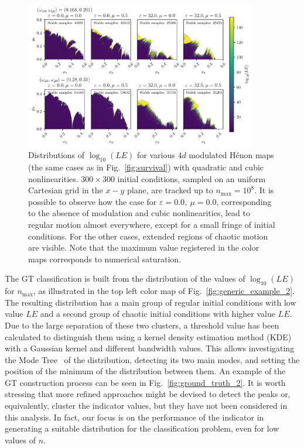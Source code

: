 \begin{figure}[htp]
    \centering
    \includegraphics[width=0.9\textwidth]{6_dynamic_indicators/figs/gt_example_colormap.pdf}
    \caption{Distributions of $\log_{10}(LE)$ for various $4d$ modulated Hénon maps (the same cases as in Fig.~\ref{fig:survival}) with quadratic and cubic nonlinearities. $300\times300$ initial conditions, sampled on an uniform Cartesian grid in the $x-y$ plane, are tracked up to $n_\text{max}=10^8$. It is possible to observe how the case for $\varepsilon=0.0,\ \mu=0.0$, corresponding to the absence of modulation and cubic nonlinearities, lead to regular motion almost everywhere, except for a small fringe of initial conditions. For the other cases, extended regions of chaotic motion are visible. Note that the maximum value registered in the color maps corresponds to numerical saturation.}
    \label{fig:ground_truth_bis}
\end{figure}

The GT classification is built from the distribution of the values of $\log_{10}(LE)$ for $n_\text{max}$, as illustrated in the top left color map of Fig.~\ref{fig:generic_example_2}. The resulting distribution has a main group of regular initial conditions with low value $LE$ and a second group of chaotic initial conditions with higher value $LE$. Due to the large separation of these two clusters, a threshold value has been calculated to distinguish them using a kernel density estimation method (KDE)~\cite{doi:10.1080/24709360.2017.1396742, refId0} with a Gaussian kernel and different bandwidth values. This allows investigating the Mode Tree~\cite{10.2307/1390955} of the distribution, detecting its two main modes, and setting the position of the minimum of the distribution between them. An example of the GT construction process can be seen in Fig.~\ref{fig:ground_truth_2}. It is worth stressing that more refined approaches might be devised to detect the peaks or, equivalently, cluster the indicator values, but they have not been considered in this analysis. In fact, our focus is on the performance of the indicator in generating a suitable distribution for the classification problem, even for low values of $n$.

